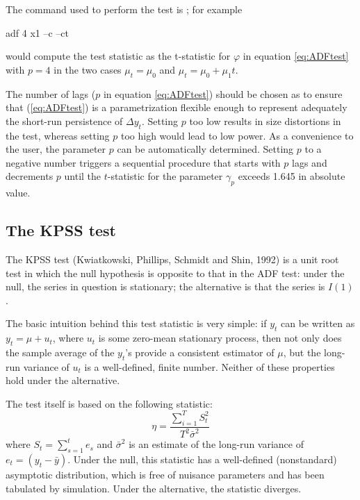 The  command used to perform the test is ; for example
\begin{code}
  adf 4 x1 --c --ct
\end{code}
would compute the test statistic as the t-statistic for $\varphi$ in
equation \ref{eq:ADFtest} with $p=4$ in the two cases $\mu_t = \mu_0$
and $\mu_t = \mu_0 + \mu_1 t$.

The number of lags ($p$ in equation \ref{eq:ADFtest}) should be chosen
as to ensure that (\ref{eq:ADFtest}) is a parametrization flexible
enough to represent adequately the short-run persistence of $\Delta
y_t$. Setting $p$ too low results in size distortions in the test,
whereas setting $p$ too high would lead to low power. As a convenience
to the user, the parameter $p$ can be automatically determined.
Setting $p$ to a negative number triggers a sequential procedure that
starts with $p$ lags and decrements $p$ until the $t$-statistic for
the parameter $\gamma_p$ exceeds 1.645 in absolute value.

\subsection{The KPSS test}
\label{sec:KPSStest}

The KPSS test (Kwiatkowski, Phillips, Schmidt and Shin, 1992) is a
unit root test in which the null hypothesis is opposite to that in the
ADF test: under the null, the series in question is stationary; the
alternative is that the series is $I(1)$.

The basic intuition behind this test statistic is very simple: if
$y_t$ can be written as $y_t = \mu + u_t$, where $u_t$ is some
zero-mean stationary process, then not only does the sample average of
the $y_t$'s provide a consistent estimator of $\mu$, but the long-run
variance of $u_t$ is a well-defined, finite number. Neither of these
properties hold under the alternative.

The test itself is based on the following statistic:
\begin{equation}
  \label{eq:KPSStest}
  \eta = \frac{\sum_{i=1}^T S_t^2 }{ T^2 \bar{\sigma}^2 }
\end{equation}
where $S_t = \sum_{s=1}^t e_s$ and $\bar{\sigma}^2$ is an estimate of
the long-run variance of $e_t = (y_t - \bar{y})$. Under the null, this
statistic has a well-defined (nonstandard) asymptotic distribution,
which is free of nuisance parameters and has been tabulated by
simulation. Under the alternative, the statistic diverges.

